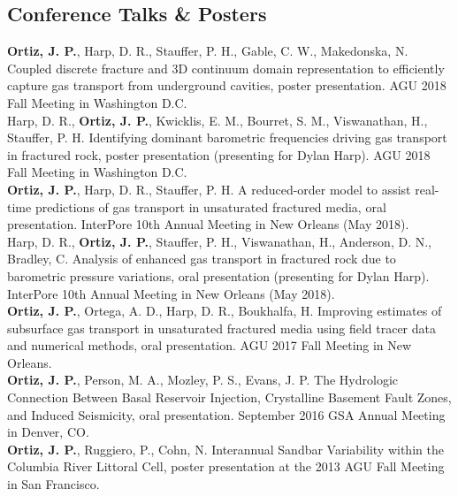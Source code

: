 \documentclass[11pt, letterpaper]{article}
\newcommand{\years}[1]{\marginnote{\scriptsize #1}}
\begin{document}
\subsection*{Conference Talks \& Posters}
\years{2018}\textbf{Ortiz, J. P.}, Harp, D. R., Stauffer, P. H., Gable, C. W.,
Makedonska, N. Coupled discrete fracture and 3D continuum domain representation
to efficiently capture gas transport from underground cavities, poster
presentation. AGU 2018 Fall Meeting in Washington D.C.\\
\years{2018}Harp, D. R., \textbf{Ortiz, J. P.}, Kwicklis, E. M., Bourret, S.
M., Viswanathan, H., Stauffer, P. H. Identifying dominant barometric
frequencies driving gas transport in fractured rock, poster presentation
(presenting for Dylan Harp). AGU 2018 Fall Meeting in Washington D.C.\\
\years{2018}\textbf{Ortiz, J. P.}, Harp, D. R., Stauffer, P. H. A reduced-order
model to assist real-time predictions of gas transport in unsaturated fractured
media, oral presentation. InterPore 10th Annual Meeting in New Orleans (May
2018).\\
\years{2018}Harp, D. R., \textbf{Ortiz, J. P.}, Stauffer, P. H., Viswanathan,
H., Anderson, D. N., Bradley, C. Analysis of enhanced gas transport in
fractured rock due to barometric pressure variations, oral presentation
(presenting for Dylan Harp). InterPore 10th Annual Meeting in New Orleans (May
2018).\\
\years{2017}\textbf{Ortiz, J. P.}, Ortega, A. D., Harp, D. R., Boukhalfa, H.
Improving estimates of subsurface gas transport in unsaturated fractured media
using field tracer data and numerical methods, oral presentation. AGU 2017 Fall
Meeting in New Orleans.\\
\years{2016}\textbf{Ortiz, J. P.}, Person, M. A., Mozley, P. S., Evans, J. P.
The Hydrologic Connection Between Basal Reservoir Injection, Crystalline
Basement Fault Zones, and Induced Seismicity, oral presentation. September 2016
GSA Annual Meeting in Denver, CO.\\
\years{2013}\textbf{Ortiz, J. P.}, Ruggiero, P., Cohn, N. Interannual Sandbar
Variability within the Columbia River Littoral Cell, poster presentation at the
2013 AGU Fall Meeting in San Francisco.


%
\end{document}
